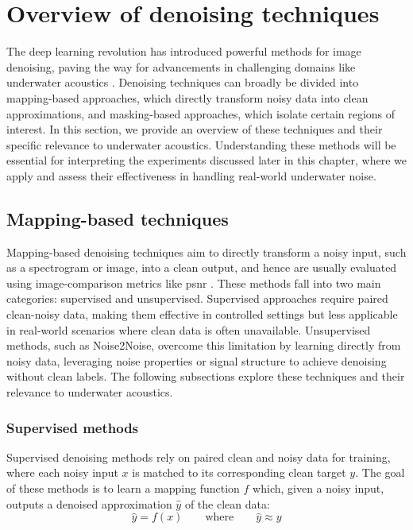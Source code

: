\section{Overview of denoising techniques}\label{sec:denoising-techniques}

The deep learning revolution has introduced powerful methods for image denoising, paving the way for advancements in challenging domains like underwater acoustics \cite{smith_underwater_2022, gao_underwater_2024}. Denoising techniques can broadly be divided into mapping-based approaches, which directly transform noisy data into clean approximations, and masking-based approaches, which isolate certain regions of interest.  In this section, we provide an overview of these techniques and their specific relevance to underwater acoustics. Understanding these methods will be essential for interpreting the experiments discussed later in this chapter, where we apply and assess their effectiveness in handling real-world underwater noise.

\subsection{Mapping-based techniques}

Mapping-based denoising techniques aim to directly transform a noisy input, such as a spectrogram or image, into a clean output, and hence are usually evaluated using image-comparison metrics like \acrfull{psnr} \cite{zhou_self-noise_2023, alamdari_improving_2020}. These methods fall into two main categories: supervised and unsupervised. Supervised approaches require paired clean-noisy data, making them effective in controlled settings but less applicable in real-world scenarios where clean data is often unavailable. Unsupervised methods, such as Noise2Noise, overcome this limitation by learning directly from noisy data, leveraging noise properties or signal structure to achieve denoising without clean labels. The following subsections explore these techniques and their relevance to underwater acoustics.

\subsubsection{Supervised methods}

Supervised denoising methods rely on paired clean and noisy data for training, where each noisy input $x$ is matched to its corresponding clean target $y$. The goal of these methods is to learn a mapping function $f$ which, given a noisy input, outputs a denoised approximation $\hat{y}$ of the clean data:
\begin{equation}
    \hat{y} = f(x) \qquad \text{where} \qquad \hat{y} \approx y
\end{equation}

